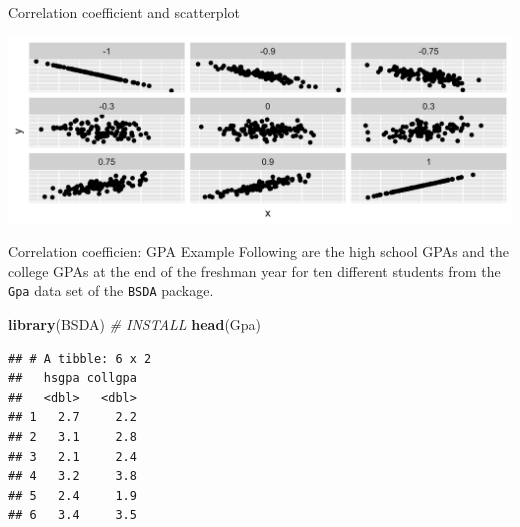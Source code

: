\documentclass[
  ignorenonframetext,
]{beamer}
\newenvironment{Shaded}{\begin{snugshade}}{\end{snugshade}}
\newcommand{\CommentTok}[1]{\textcolor[rgb]{0.56,0.35,0.01}{\textit{#1}}}
\newcommand{\FunctionTok}[1]{\textcolor[rgb]{0.13,0.29,0.53}{\textbf{#1}}}
\newcommand{\NormalTok}[1]{#1}
\begin{document}
\begin{frame}{Correlation coefficient and scatterplot}
\protect\hypertarget{correlation-coefficient-and-scatterplot}{}
\begin{center}\includegraphics[width=0.8\linewidth,height=0.85\textheight]{week4_2} \end{center}
\end{frame}

\begin{frame}[fragile]{Correlation coefficien: GPA Example}
\protect\hypertarget{correlation-coefficien-gpa-example}{}
Following are the high school GPAs and the college GPAs at the end of
the freshman year for ten different students from the \texttt{Gpa} data
set of the \texttt{BSDA} package.

\tiny

\begin{Shaded}
\begin{Highlighting}[]
\FunctionTok{library}\NormalTok{(BSDA)  }\CommentTok{\# INSTALL}
\FunctionTok{head}\NormalTok{(Gpa)}
\end{Highlighting}
\end{Shaded}

\begin{verbatim}
## # A tibble: 6 x 2
##   hsgpa collgpa
##   <dbl>   <dbl>
## 1   2.7     2.2
## 2   3.1     2.8
## 3   2.1     2.4
## 4   3.2     3.8
## 5   2.4     1.9
## 6   3.4     3.5
\end{verbatim}

\normalsize
\end{frame}
\end{document}
